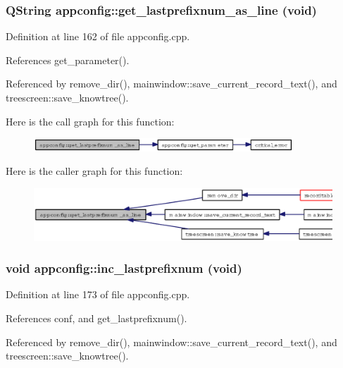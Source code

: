 \subsubsection{\setlength{\rightskip}{0pt plus 5cm}QString appconfig::get\_\-lastprefixnum\_\-as\_\-line (void)}\label{classappconfig_fdf2d9c2c13bfd05de4e7dad69ed5614}




Definition at line 162 of file appconfig.cpp.

References get\_\-parameter().

Referenced by remove\_\-dir(), mainwindow::save\_\-current\_\-record\_\-text(), and treescreen::save\_\-knowtree().

Here is the call graph for this function:\begin{figure}[H]
\begin{center}
\leavevmode
\includegraphics[width=276pt]{classappconfig_fdf2d9c2c13bfd05de4e7dad69ed5614_cgraph}
\end{center}
\end{figure}


Here is the caller graph for this function:\begin{figure}[H]
\begin{center}
\leavevmode
\includegraphics[width=357pt]{classappconfig_fdf2d9c2c13bfd05de4e7dad69ed5614_icgraph}
\end{center}
\end{figure}
\subsubsection{\setlength{\rightskip}{0pt plus 5cm}void appconfig::inc\_\-lastprefixnum (void)}\label{classappconfig_f96423b10ba9101a88de147b1f4fe7bb}




Definition at line 173 of file appconfig.cpp.

References conf, and get\_\-lastprefixnum().

Referenced by remove\_\-dir(), mainwindow::save\_\-current\_\-record\_\-text(), and treescreen::save\_\-knowtree().

